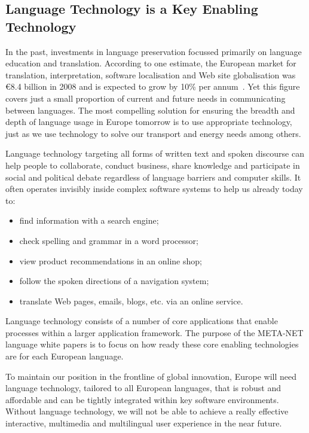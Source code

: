 \documentclass[]{../metanetpaper}
\begin{document}
\begin{multicols}{2}
\subsection{Language Technology is a Key Enabling Technology}

In the past, investments in language preservation focussed primarily on language education and translation. According to one estimate, the European market for translation, interpretation, software localisation and Web site globalisation was €8.4 billion in 2008 and is expected to grow by 10\% per annum~\cite{EC3}. Yet this figure covers just a small proportion of current and future needs in communicating between languages. The most compelling solution for ensuring the breadth and depth of language usage in Europe tomorrow is to use appropriate technology, just as we use technology to solve our transport and energy needs among others.

Language technology targeting all forms of written text and spoken discourse can help people to collaborate, conduct business, share knowledge and participate in social and political debate regardless of language barriers and computer skills. It often operates invisibly inside complex software systems to help us already today to:

\begin{itemize}
\item find information with a search engine;
\item check spelling and grammar in a word processor;
\item view product recommendations in an online shop;
\item follow the spoken directions of a navigation system;
\item translate Web pages, emails, blogs, etc. via an online service.
\end{itemize}

Language technology consists of a number of core applications that enable processes within a larger application framework. The purpose of the META-NET language white papers is to focus on how ready these core enabling technologies are for each European language. 


To maintain our position in the frontline of global innovation, Europe will need language technology, tailored to all European languages, that is robust and affordable and can be tightly integrated within key software environments. Without language technology, we will not be able to achieve a really effective interactive, multimedia and multilingual user experience in the near future.


\end{multicols}
\end{document}
